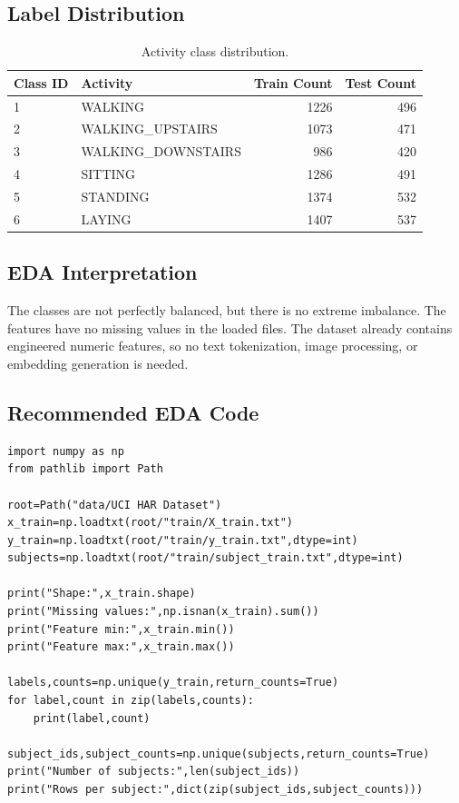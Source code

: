 \documentclass{article}
\begin{document}
\subsection{Label Distribution}
\begin{table}[H]
\centering
\begin{tabular}{llrr}
\toprule
Class ID & Activity & Train Count & Test Count \\
\midrule
1 & WALKING & 1226 & 496 \\
2 & WALKING\_UPSTAIRS & 1073 & 471 \\
3 & WALKING\_DOWNSTAIRS & 986 & 420 \\
4 & SITTING & 1286 & 491 \\
5 & STANDING & 1374 & 532 \\
6 & LAYING & 1407 & 537 \\
\bottomrule
\end{tabular}
\caption{Activity class distribution.}
\end{table}

\subsection{EDA Interpretation}
The classes are not perfectly balanced, but there is no extreme imbalance. The features have no missing values in the loaded files. The dataset already contains engineered numeric features, so no text tokenization, image processing, or embedding generation is needed.

\subsection{Recommended EDA Code}
\begin{lstlisting}
import numpy as np
from pathlib import Path

root=Path("data/UCI HAR Dataset")
x_train=np.loadtxt(root/"train/X_train.txt")
y_train=np.loadtxt(root/"train/y_train.txt",dtype=int)
subjects=np.loadtxt(root/"train/subject_train.txt",dtype=int)

print("Shape:",x_train.shape)
print("Missing values:",np.isnan(x_train).sum())
print("Feature min:",x_train.min())
print("Feature max:",x_train.max())

labels,counts=np.unique(y_train,return_counts=True)
for label,count in zip(labels,counts):
    print(label,count)

subject_ids,subject_counts=np.unique(subjects,return_counts=True)
print("Number of subjects:",len(subject_ids))
print("Rows per subject:",dict(zip(subject_ids,subject_counts)))
\end{lstlisting}
\end{document}
